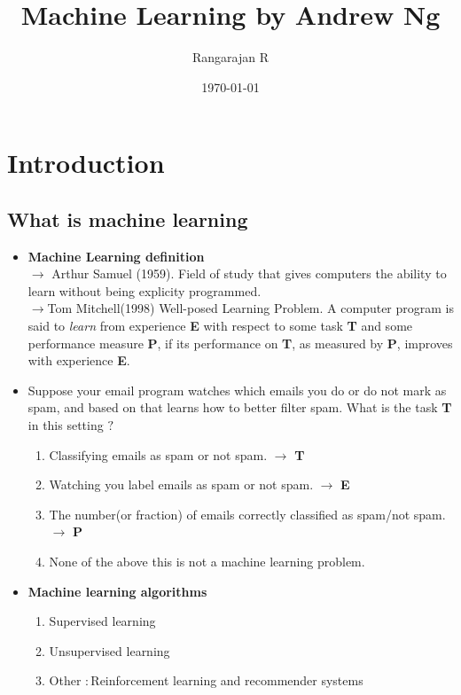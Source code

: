 \documentclass[13pt]{book}
\title{Machine Learning by Andrew Ng}
\author{Rangarajan R}
\date{\today}
\begin{document}
\maketitle
\tableofcontents

\mainmatter{}
\chapter{Introduction}
\section{What is machine learning}
\begin{itemize}
\item \textbf{Machine Learning definition} \\
  \(\rightarrow\) Arthur Samuel (1959). Field of study that gives computers the ability to learn without being explicity programmed. \\
  \(\rightarrow\)Tom Mitchell(1998) Well-posed Learning Problem. A computer program is said to \emph{learn} from experience \textbf{E} with respect to some task \textbf{T} and some performance measure \textbf{P}, if its performance on \textbf{T}, as measured by \textbf{P}, improves with experience \textbf{E}.
\item Suppose your email program watches which emails you do or do not mark as spam, and based on that learns how to better filter spam. What is the task \textbf{T} in this setting \(?\)
  \begin{enumerate}
\item Classifying emails as spam or not spam. \(\rightarrow\) \textbf{T}
\item Watching you label emails as spam or not spam. \(\rightarrow\) \textbf{E}
\item The number(or fraction) of emails correctly classified as spam/not spam. \(\rightarrow\) \textbf{P}
\item None of the above this is not a machine learning problem.
  \end{enumerate}
\item \textbf{Machine learning algorithms}
  \begin{enumerate}
\item Supervised learning
\item Unsupervised learning
\item Other \(:\)Reinforcement learning and recommender systems
  \end{enumerate}
\end{itemize}
\end{document}
